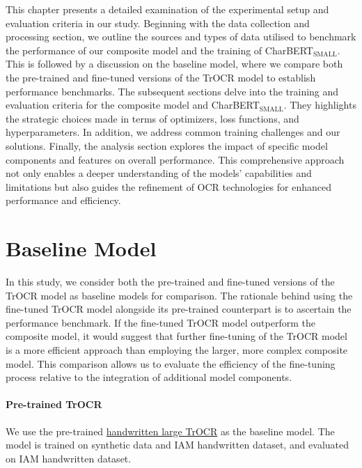 \label{chap:4_experiment}
This chapter presents a detailed examination of the experimental setup and evaluation criteria in our study. Beginning with the data collection and processing section, we outline the sources and types of data utilised to benchmark the performance of our composite model and the training of CharBERT${_\text{SMALL}}$. This is followed by a discussion on the baseline model, where we compare both the pre-trained and fine-tuned versions of the TrOCR model to establish performance benchmarks. The subsequent sections delve into the training and evaluation criteria for the composite model and CharBERT${_\text{SMALL}}$. They highlights the strategic choices made in terms of optimizers, loss functions, and hyperparameters. In addition, we address common training challenges and our solutions. Finally, the analysis section explores the impact of specific model components and features on overall performance. This comprehensive approach not only enables a deeper understanding of the models' capabilities and limitations but also guides the refinement of OCR technologies for enhanced performance and efficiency.
\section{Baseline Model}
\label{sec:4_baseline_model}
In this study, we consider both the pre-trained and fine-tuned versions of the TrOCR model as baseline models for comparison. The rationale behind using the fine-tuned TrOCR model alongside its pre-trained counterpart is to ascertain the performance benchmark. If the fine-tuned TrOCR model outperform the composite model, it would suggest that further fine-tuning of the TrOCR model is a more efficient approach than employing the larger, more complex composite model. This comparison allows us to evaluate the efficiency of the fine-tuning process relative to the integration of additional model components.
\paragraph*{Pre-trained TrOCR}
\label{par:4_pre-trained_trocr}
We use the pre-trained \href{https://huggingface.co/microsoft/trocr-large-handwritten}{handwritten large TrOCR} as the baseline model. The model is trained on synthetic data and IAM handwritten dataset, and evaluated on IAM handwritten dataset.
